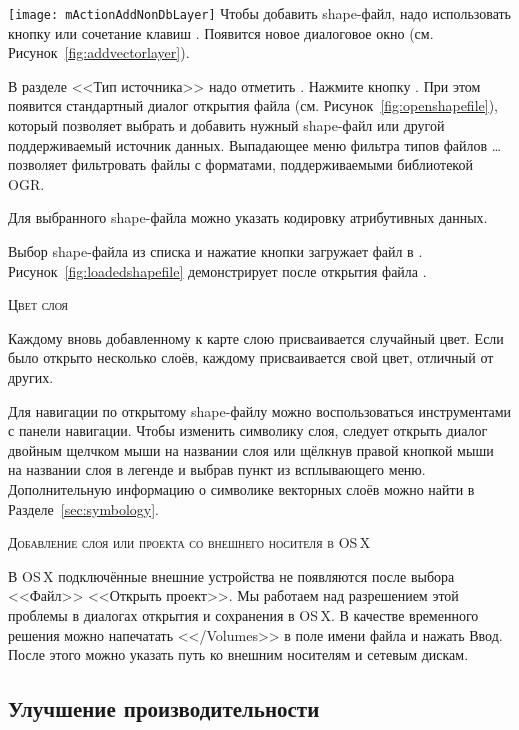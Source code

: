 \texttt{[image: mActionAddNonDbLayer]} Чтобы добавить shape-файл,
надо использовать кнопку 
 или сочетание клавиш .
Появится новое диалоговое окно (см. Рисунок~\ref{fig:addvectorlayer}).

В разделе <<Тип источника>> надо отметить . Нажмите
кнопку . При этом появится стандартный диалог открытия файла
(см. Рисунок~\ref{fig:openshapefile}), который позволяет выбрать и добавить
нужный shape-файл или другой поддерживаемый источник данных. Выпадающее меню
фильтра типов файлов \ldots позволяет фильтровать
файлы с форматами, поддерживаемыми библиотекой OGR.

Для выбранного shape-файла можно указать кодировку атрибутивных данных.

Выбор shape-файла из списка и нажатие кнопки  загружает
файл в \qg. Рисунок~\ref{fig:loadedshapefile} демонстрирует \qg после
открытия файла .


\begin{Tip}\caption{\textsc{Цвет слоя}}
Каждому вновь добавленному к карте слою присваивается случайный цвет.
Если было открыто несколько слоёв, каждому присваивается свой цвет,
отличный от других.
\end{Tip}

Для навигации по открытому shape-файлу можно воспользоваться инструментами
с панели навигации. Чтобы изменить символику слоя, следует открыть диалог
 двойным щелчком мыши на названии слоя или щёлкнув
правой кнопкой мыши на названии слоя в легенде и выбрав пункт
 из всплывающего меню. Дополнительную информацию
о символике векторных слоёв можно найти в Разделе~\ref{sec:symbology}.

\begin{Tip}\caption{\textsc{Добавление слоя или проекта со внешнего носителя в OS\,X}}
В OS\,X подключённые внешние устройства не появляются после выбора <<Файл>> \arrow
<<Открыть проект>>. Мы работаем над разрешением этой проблемы в диалогах
открытия и сохранения в OS\,X. В качестве временного решения можно напечатать
<</Volumes>> в поле имени файла и нажать Ввод. После этого можно указать путь
ко внешним носителям и сетевым дискам.
\end{Tip}

\subsection{Улучшение производительности}

